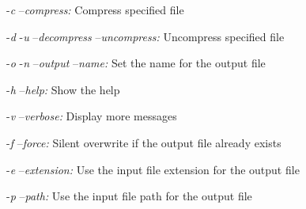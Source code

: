 \begin{DoxyItemize}
\item -\/{\itshape c} --{\itshape compress\-:} Compress specified file
\item -\/{\itshape d} -\/{\itshape u} --{\itshape decompress} --{\itshape uncompress\-:} Uncompress specified file
\item -\/{\itshape o} -\/{\itshape n} --{\itshape output} --{\itshape name\-:} Set the name for the output file
\item -\/{\itshape h} --{\itshape help\-:} Show the help
\item -\/{\itshape v} --{\itshape verbose\-:} Display more messages
\item -\/{\itshape f} --{\itshape force\-:} Silent overwrite if the output file already exists
\item -\/{\itshape e} --{\itshape extension\-:} Use the input file extension for the output file
\item -\/{\itshape p} --{\itshape path\-:} Use the input file path for the output file 
\end{DoxyItemize}